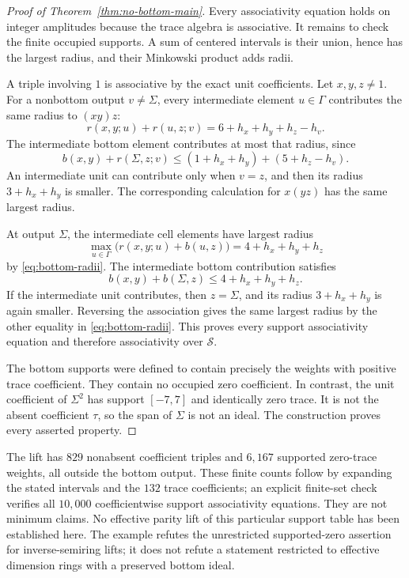 \begin{proof}[Proof of Theorem~\ref{thm:no-bottom-main}]
Every associativity equation holds on integer amplitudes because the trace algebra is associative. It remains to check the finite occupied supports. A sum of centered intervals is their union, hence has the largest radius, and their Minkowski product adds radii.

A triple involving $1$ is associative by the exact unit coefficients. Let $x,y,z\ne1$. For a nonbottom output $v\ne\Sigma$, every intermediate element $u\in\Gamma$ contributes the same radius to $(xy)z$:
\[
 r(x,y;u)+r(u,z;v)=6+h_x+h_y+h_z-h_v.
\]
The intermediate bottom element contributes at most that radius, since
\[
 b(x,y)+r(\Sigma,z;v)
 \le(1+h_x+h_y)+(5+h_z-h_v).
\]
An intermediate unit can contribute only when $v=z$, and then its radius $3+h_x+h_y$ is smaller. The corresponding calculation for $x(yz)$ has the same largest radius.

At output $\Sigma$, the intermediate cell elements have largest radius
\[
 \max_{u\in\Gamma}\bigl(r(x,y;u)+b(u,z)\bigr)
   =4+h_x+h_y+h_z
\]
by \eqref{eq:bottom-radii}. The intermediate bottom contribution satisfies
\[
 b(x,y)+b(\Sigma,z)\le4+h_x+h_y+h_z.
\]
If the intermediate unit contributes, then $z=\Sigma$, and its radius $3+h_x+h_y$ is again smaller. Reversing the association gives the same largest radius by the other equality in \eqref{eq:bottom-radii}. This proves every support associativity equation and therefore associativity over $\mathcal S$.

The bottom supports were defined to contain precisely the weights with positive trace coefficient. They contain no occupied zero coefficient. In contrast, the unit coefficient of $\Sigma^2$ has support $[-7,7]$ and identically zero trace. It is not the absent coefficient $\tau$, so the span of $\Sigma$ is not an ideal. The construction proves every asserted property.
\end{proof}

The lift has $829$ nonabsent coefficient triples and $6{,}167$ supported zero-trace weights, all outside the bottom output. These finite counts follow by expanding the stated intervals and the $132$ trace coefficients; an explicit finite-set check verifies all $10{,}000$ coefficientwise support associativity equations. They are not minimum claims. No effective parity lift of this particular support table has been established here. The example refutes the unrestricted supported-zero assertion for inverse-semiring lifts; it does not refute a statement restricted to effective dimension rings with a preserved bottom ideal.
